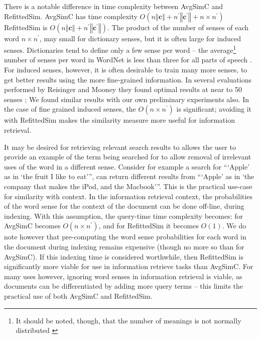 \documentclass{sig-alternate}
\renewcommand{\c}{\mathbf{c}}
\begin{document}
There is a notable difference in time complexity between AvgSimC and RefittedSim.
AvgSimC has time complexity $O(n\left\Vert \c\right\Vert +n^{\prime}\left\Vert \c^{\prime}\right\Vert +n\times n^{\prime})$
RefittedSim is $O(n\left\Vert \c\right\Vert +n^{\prime}\left\Vert \c^{\prime}\right\Vert)$.
The product of the number of senses of each word $n \times n^\prime$, may small for dictionary senses, but it is often large for induced senses. Dictionaries tend to define only a few sense per word -- the average\footnote{It should be noted, though, that the number of meanings is not normally distributed \parencite{zipf1945meaning}} number of senses per word in WordNet is less than three for all parts of speech \parencite{miller1995wordnet}. For induced senses, however, it is often desirable to train many more senses, to get better results using the more fine-grained information. In several evaluations performed by Reisinger and Mooney they found optimal results at near to 50 senses \parencite{Reisinger2010}; We found similar results with our own preliminary experiments also. In the case of fine grained induced senses, the $O(n \times n^\prime)$ is significant; avoiding it with RefittedSim makes the similarity measure more useful for information retrieval.

It may be desired for retrieving relevant search results to allows the user to provide an example of the term being searched for to allow removal of irrelevant uses of the word in a different sense. Consider for example a search for \enquote{\enquote{Apple} as in \enquote{the fruit I like to eat}}, can return different results from \enquote{\enquote{Apple} as in \enquote{the company that makes the iPod, and the Macbook}}. This is the practical use-case for similarity with context.
In the information retrieval context, the probabilities of the word sense for the context of the document can be done off-line, during indexing. With this assumption, the query-time time complexity becomes: for AvgSimC becomes $O(n\times n^{\prime})$, and for RefittedSim it becomes $O(1)$.
We do note however that pre-computing the word sense probabilities for each word in the document during indexing remains expensive (though no more so than for AvgSimC). If this indexing time is considered worthwhile, then RefittedSim is significantly more viable for use in information retrieve tasks than AvgSimC. For many uses however, ignoring word senses in information retrieval is viable, as documents can be differentiated by adding more query terms -- this limits the practical use of both AvgSimC and RefittedSim.
\end{document}

